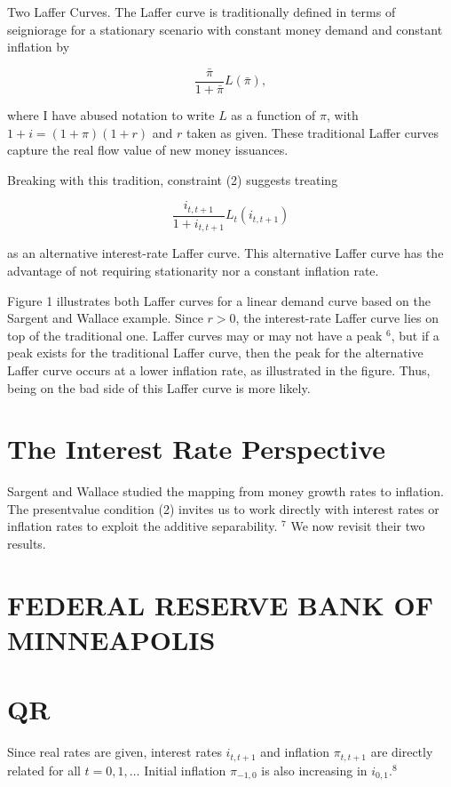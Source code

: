 \documentclass[10pt]{article}
\begin{document}
Two Laffer Curves. The Laffer curve is traditionally defined in terms of seigniorage for a stationary scenario with constant money demand and constant inflation by

\begin{equation*}
\frac{\bar{\pi}}{1+\bar{\pi}} L(\bar{\pi}),
\end{equation*}

where I have abused notation to write $L$ as a function of $\pi$, with $1+i=(1+\pi)(1+r)$ and $r$ taken as given. These traditional Laffer curves capture the real flow value of new money issuances.

Breaking with this tradition, constraint (2) suggests treating

\begin{equation*}
\frac{i_{t, t+1}}{1+i_{t, t+1}} L_{t}\left(i_{t, t+1}\right)
\end{equation*}

as an alternative interest-rate Laffer curve. This alternative Laffer curve has the advantage of not requiring stationarity nor a constant inflation rate.

Figure 1 illustrates both Laffer curves for a linear demand curve based on the Sargent and Wallace example. Since $r>0$, the interest-rate Laffer curve lies on top of the traditional one. Laffer curves may or may not have a peak ${ }^{6}$, but if a peak exists for the traditional Laffer curve, then the peak for the alternative Laffer curve occurs at a lower inflation rate, as illustrated in the figure. Thus, being on the bad side of this Laffer curve is more likely.

\section*{The Interest Rate Perspective}
Sargent and Wallace studied the mapping from money growth rates to inflation. The presentvalue condition (2) invites us to work directly with interest rates or inflation rates to exploit the additive separability. ${ }^{7}$ We now revisit their two results.

\section*{FEDERAL RESERVE BANK OF MINNEAPOLIS}
\section*{QR}
Since real rates are given, interest rates $i_{t, t+1}$ and inflation $\pi_{t, t+1}$ are directly related for all $t=0,1, \ldots$ Initial inflation $\pi_{-1,0}$ is also increasing in $i_{0,1} .{ }^{8}$
\end{document}
